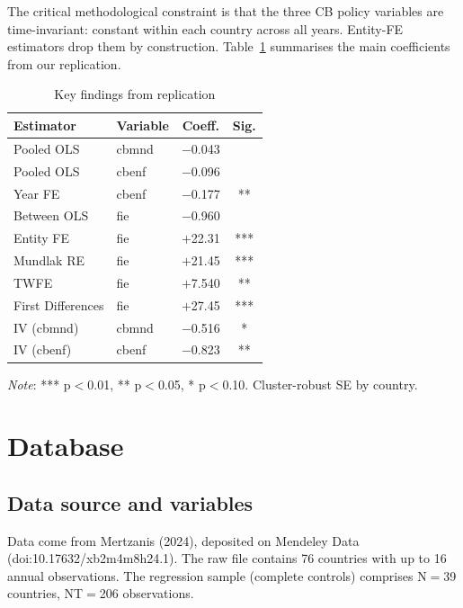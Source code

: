 \documentclass[12pt,a4paper]{article}
\begin{document}
The critical methodological constraint is that the three CB policy variables
are time-invariant: constant within each country across all years. Entity-FE
estimators drop them by construction. Table~\ref{tab:keyfind} summarises the
main coefficients from our replication.

\begin{table}[H]
\centering
\caption{Key findings from replication}
\label{tab:keyfind}
\begin{tabular}{llcc}
\toprule
Estimator & Variable & Coeff. & Sig. \\
\midrule
Pooled OLS    & cbmnd & $-$0.043 & \\
Pooled OLS    & cbenf & $-$0.096 & \\
Year FE       & cbenf & $-$0.177 & ** \\
\midrule
Between OLS       & fie & $-$0.960 & \\
Entity FE         & fie & $+$22.31 & *** \\
Mundlak RE        & fie & $+$21.45 & *** \\
TWFE              & fie & $+$7.540 & ** \\
First Differences & fie & $+$27.45 & *** \\
\midrule
IV (cbmnd) & cbmnd & $-$0.516 & * \\
IV (cbenf) & cbenf & $-$0.823 & ** \\
\bottomrule
\end{tabular}
\end{table}

\noindent\textit{Note}: *** p$<$0.01, ** p$<$0.05, * p$<$0.10.
Cluster-robust SE by country.

\section{Database}

\subsection{Data source and variables}

Data come from Mertzanis (2024), deposited on Mendeley Data
(doi:10.17632/xb2m4m8h24.1). The raw file contains 76 countries with up to
16 annual observations. The regression sample (complete controls) comprises
N$=$39 countries, NT$=$206 observations.
\end{document}

